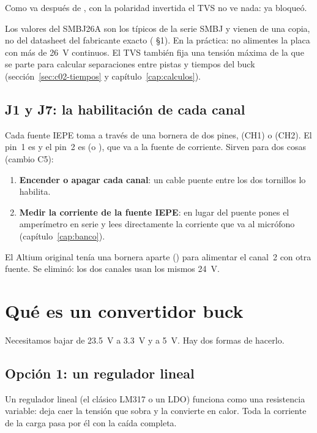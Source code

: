 Como  va después de , con la polaridad invertida el TVS no ve nada:  ya bloqueó.

\begin{ojo}
Los valores del SMBJ26A son los típicos de la serie SMBJ y vienen de una copia, no del datasheet del fabricante exacto ( §1). En la práctica: no alimentes la placa con más de \SI{26}{\volt} continuos. El TVS también fija una tensión máxima de la que se parte para calcular separaciones entre pistas y tiempos del buck (sección~\ref{sec:c02-tiempos} y capítulo~\ref{cap:calculos}).
\end{ojo}

\subsection{J1 y J7: la habilitación de cada canal}

Cada fuente IEPE toma  a través de una bornera de dos pines,  (CH1) o  (CH2). El pin~1 es  y el pin~2 es  (o ), que va a la fuente de corriente. Sirven para dos cosas (cambio C5):
\begin{enumerate}
  \item \textbf{Encender o apagar cada canal}: un cable puente entre los dos tornillos lo habilita.
  \item \textbf{Medir la corriente de la fuente IEPE}: en lugar del puente pones el amperímetro en serie y lees directamente la corriente que va al micrófono (capítulo~\ref{cap:banco}).
\end{enumerate}
El Altium original tenía una bornera aparte () para alimentar el canal~2 con otra fuente. Se eliminó: los dos canales usan los mismos \SI{24}{\volt}.

\section{Qué es un convertidor buck}\label{sec:c02-buck}

Necesitamos bajar de \SI{23.5}{\volt} a \SI{3.3}{\volt} y a \SI{5}{\volt}. Hay dos formas de hacerlo.

\subsection{Opción 1: un regulador lineal}
Un regulador lineal (el clásico LM317 o un LDO) funciona como una resistencia variable: deja caer la tensión que sobra y la convierte en calor. Toda la corriente de la carga pasa por él con la caída completa.

